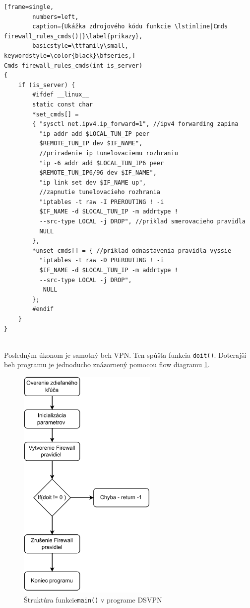 \begin{minipage}{\linewidth} 	
	\begin{lstlisting}[frame=single,
		numbers=left,
		caption={Ukážka zdrojového kódu funkcie \lstinline|Cmds firewall_rules_cmds()|}\label{prikazy},
		basicstyle=\ttfamily\small, keywordstyle=\color{black}\bfseries,]
Cmds firewall_rules_cmds(int is_server)
{
	if (is_server) {
		#ifdef __linux__
		static const char
		*set_cmds[] =
		{ "sysctl net.ipv4.ip_forward=1", //ipv4 forwarding zapina
	   	  "ip addr add $LOCAL_TUN_IP peer 
	   	  $REMOTE_TUN_IP dev $IF_NAME", 
	   	  //priradenie ip tunelovaciemu rozhraniu
		  "ip -6 addr add $LOCAL_TUN_IP6 peer 
		  $REMOTE_TUN_IP6/96 dev $IF_NAME",
		  "ip link set dev $IF_NAME up", 
		  //zapnutie tunelovacieho rozhrania
		  "iptables -t raw -I PREROUTING ! -i 
		  $IF_NAME -d $LOCAL_TUN_IP -m addrtype ! 
		  --src-type LOCAL -j DROP", //priklad smerovacieho pravidla
		  NULL 
	    },
		*unset_cmds[] = { //priklad odnastavenia pravidla vyssie
		  "iptables -t raw -D PREROUTING ! -i 
		  $IF_NAME -d $LOCAL_TUN_IP -m addrtype ! 
		  --src-type LOCAL -j DROP",
		   NULL
		};
		#endif
	}
}
	\end{lstlisting}
\end{minipage}\\ 
 
Posledným úkonom je samotný beh VPN. Ten spúšťa funkcia \lstinline|doit()|. Doterajší beh programu je jednoducho znázornený pomocou flow diagramu \ref{fc1}.
 
\begin{figure}[!h]
	\centering
	\includegraphics[width=0.6\textwidth]{figures/fc1}
	\caption{Štruktúra funkcie\lstinline|main()| v programe DSVPN}
	\label{fc1}
\end{figure}

